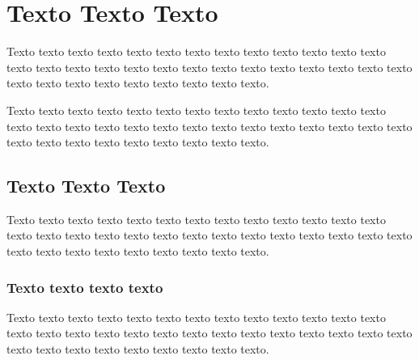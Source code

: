 \section{Texto Texto Texto}
Texto texto texto texto texto texto texto texto texto texto texto texto texto texto texto texto texto texto texto texto texto texto texto texto texto texto texto texto texto texto texto texto texto texto texto texto.

Texto texto texto texto texto texto texto texto texto texto texto texto texto texto texto texto texto texto texto texto texto texto texto texto texto texto texto texto texto texto texto texto texto texto texto texto.

\subsection{Texto Texto Texto}

Texto texto texto texto texto texto texto texto texto texto texto texto texto texto texto texto texto texto texto texto texto texto texto texto texto texto texto texto texto texto texto texto texto texto texto texto.

\subsubsection{Texto texto texto texto}

Texto texto texto texto texto texto texto texto texto texto texto texto texto texto texto texto texto texto texto texto texto texto texto texto texto texto texto texto texto texto texto texto texto texto texto texto.